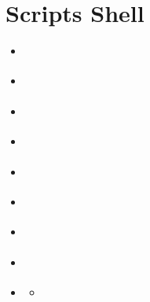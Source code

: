 \documentclass[letterpaper,10pt,french]{sphinxmanual}
\begin{document}
\chapter{Scripts Shell}
\label{\detokenize{21-scripts-shell:scripts-shell}}\label{\detokenize{21-scripts-shell::doc}}
\begin{sphinxShadowBox}
\begin{itemize}
\item {} 
\label{\detokenize{21-scripts-shell:id1}}{\hyperref[\detokenize{21-scripts-shell:remarques-generales}]{}}

\item {} 
\label{\detokenize{21-scripts-shell:id2}}{\hyperref[\detokenize{21-scripts-shell:variables}]{}}

\item {} 
\label{\detokenize{21-scripts-shell:id3}}{\hyperref[\detokenize{21-scripts-shell:quotes}]{}}

\item {} 
\label{\detokenize{21-scripts-shell:id4}}{\hyperref[\detokenize{21-scripts-shell:read-demander-une-saisie}]{}}

\item {} 
\label{\detokenize{21-scripts-shell:id5}}{\hyperref[\detokenize{21-scripts-shell:operations-mathematiques}]{}}

\item {} 
\label{\detokenize{21-scripts-shell:id6}}{\hyperref[\detokenize{21-scripts-shell:les-variables-d-environnement}]{}}

\item {} 
\label{\detokenize{21-scripts-shell:id7}}{\hyperref[\detokenize{21-scripts-shell:les-parametres}]{}}

\item {} 
\label{\detokenize{21-scripts-shell:id8}}{\hyperref[\detokenize{21-scripts-shell:les-tableaux}]{}}

\item {} 
\label{\detokenize{21-scripts-shell:id9}}{\hyperref[\detokenize{21-scripts-shell:les-conditions}]{}}
\begin{itemize}
\item {} 
\label{\detokenize{21-scripts-shell:id10}}{\hyperref[\detokenize{21-scripts-shell:tests-sur-les-chaines-de-caracteres}]{}}


\end{itemize}
\end{itemize}
\end{sphinxShadowBox}
\end{document}
